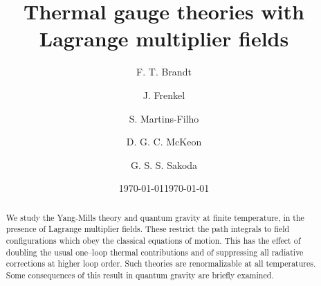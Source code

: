 \documentclass[longbibliography,groupedaddress,showpacs,showkeys,amssymb,eqsecnum,aps,nofootinbib,superscriptaddress]{revtex4}
\begin{document}
                                                                                              




\author{F. T. Brandt}

\author{J. Frenkel}

\author{S. Martins-Filho}   

\author{D. G. C. McKeon}

\author{G.  S.  S.  Sakoda}   

\title{Thermal gauge theories with Lagrange multiplier fields}


\date{\today}


\date{\today}

\begin{abstract}
We study the Yang-Mills theory and quantum gravity at finite
temperature, in the presence  of Lagrange multiplier fields. These
restrict the path integrals to field configurations which obey the 
classical equations of motion. This has  the effect of doubling the
usual one--loop thermal contributions and of suppressing all radiative 
corrections at higher loop order. 
Such theories are renormalizable at all temperatures.
Some consequences of this result 
in quantum gravity are briefly examined.
\end{abstract}
\end{document}
